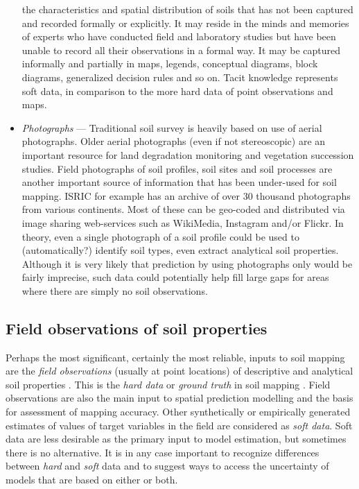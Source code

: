 \documentclass[graybox,natbib,nospthms,UStrade]{svmono}
\begin{document}
\begin{itemize}
  the characteristics and spatial distribution of soils that has not
  been captured and recorded formally or explicitly. It may reside in
  the minds and memories of experts who have conducted field and
  laboratory studies but have been unable to record all their
  observations in a formal way. It may be captured informally and
  partially in maps, legends, conceptual diagrams, block diagrams,
  generalized decision rules and so on. Tacit knowledge represents
  soft data, in comparison to the more hard data of point observations
  and maps.
\item
  \emph{Photographs} --- Traditional soil survey is heavily based on use of
  aerial photographs. Older aerial photographs (even if
  not stereoscopic) are an important resource for land degradation
  monitoring and vegetation succession studies. Field photographs of
  soil profiles, soil sites and soil processes are another important
  source of information that has been under-used for soil mapping.
  ISRIC for example has an archive of over 30 thousand photographs
  from various continents. Most of these can be geo-coded and
  distributed via image sharing web-services such as WikiMedia,
  Instagram and/or Flickr. In theory, even a single photograph of a
  soil profile could be used to (automatically?) identify soil types,
  even extract analytical soil properties. Although it is very likely
  that prediction by using photographs only would be fairly imprecise,
  such data could potentially help fill large gaps for areas where
  there are simply no soil observations.
\end{itemize}

\hypertarget{field-observations}{%
\subsection{Field observations of soil properties}\label{field-observations}}

Perhaps the most significant, certainly the most reliable, inputs to
soil mapping are the \emph{field observations} (usually at point locations)
of descriptive and analytical soil properties
\citep{SSDS1993, Schoeneberger1998}. This is the \emph{hard data} or \emph{ground
truth} in soil mapping \citep{Rossiter2001}. Field observations are also the
main input to spatial prediction modelling and the basis for assessment
of mapping accuracy. Other synthetically or empirically generated
estimates of values of target variables in the field are considered as
\emph{soft data}. Soft data are less desirable as the primary input to model
estimation, but sometimes there is no alternative. It is in any case
important to recognize differences between \emph{hard} and \emph{soft} data and to
suggest ways to access the uncertainty of models that are based on
either or both.
\end{document}
